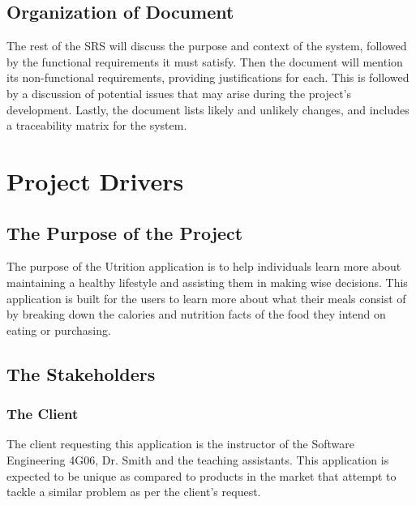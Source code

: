 \documentclass[12pt]{article}
\begin{document}
\subsection{Organization of Document}

The rest of the SRS will discuss the purpose and context of the system, 
followed by the functional requirements it must satisfy. Then the document will 
mention its non-functional requirements, providing justifications for each. 
This is followed by a discussion of potential issues that may arise during the 
project's development. Lastly, the document lists likely and unlikely 
changes, and includes a traceability matrix for the system.


\section{Project Drivers }

\subsection{The Purpose of the Project}

The purpose of the Utrition application is to help individuals learn more about maintaining a healthy lifestyle and assisting them in making wise decisions. This application is built for the users to learn more about what their meals consist of by breaking down the calories and nutrition facts of the food they intend on eating or purchasing.  

\subsection{The Stakeholders }

\subsubsection{The Client}  

The client requesting this application is the instructor of the Software Engineering 4G06, Dr. Smith and the teaching assistants. This application is expected to be unique as compared to products in the market that attempt to tackle a similar problem as per the client's request.  
\end{document}
